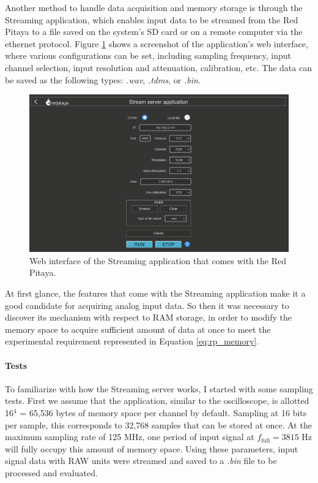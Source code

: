Another method to handle data acquisition and memory storage is through the Streaming application, which enables input data to be streamed from the Red Pitaya to a file saved on the system's SD card or on a remote computer via the ethernet protocol. Figure \ref{fig:ch2_stream_old} shows a screenshot of the application's web interface, where various configurations can be set, including sampling frequency, input channel selection, input resolution and attenuation, calibration, etc. The data can be saved as the following types: \textit{.wav}, \textit{.tdms}, or \textit{.bin}.

\begin{figure}[ht]
    \centering
    \includegraphics[width=0.9\columnwidth]{images/chapter_2/2_stream/stream_old.png}
    \caption{Web interface of the Streaming application that comes with the Red Pitaya.}
    \label{fig:ch2_stream_old}
\end{figure}

At first glance, the features that come with the Streaming application make it a good candidate for acquiring analog input data. So then it was necessary to discover its mechanism with respect to RAM storage, in order to modify the memory space to acquire sufficient amount of data at once to meet the experimental requirement represented in Equation \eqref{eq:rp_memory}.


\paragraph{Tests}

To familiarize with how the Streaming server works, I started with some sampling tests. First we assume that the application, similar to the oscilloscope, is allotted 16$^4$ = 65,536 bytes of memory space per channel by default. Sampling at 16 bits per sample, this corresponds to 32,768 samples that can be stored at once. At the maximum sampling rate of 125 MHz, one period of input signal at $f_\text{full} = 3815$ Hz will fully occupy this amount of memory space. Using these parameters, input signal data with RAW units were streamed and saved to a \textit{.bin} file to be processed and evaluated.

